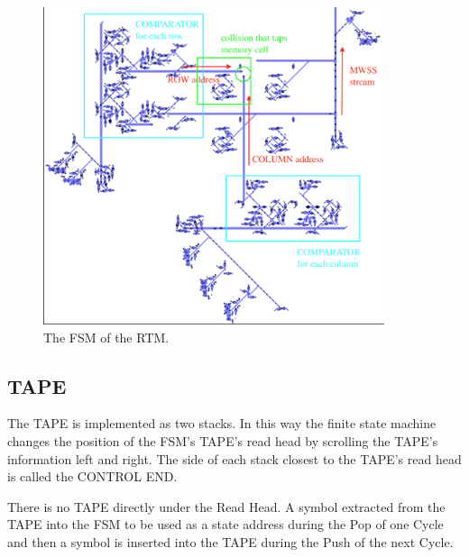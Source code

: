 \documentclass{article}
\begin{document}
\begin{figure}[h]
\centering
\includegraphics[width=10cm,keepaspectratio]{images/FSM.png}
\captionsetup{labelformat=empty} \caption{The FSM of the RTM.}
\end{figure}
\subsection{TAPE}


The TAPE is implemented as two stacks. In this way the finite state machine changes the position of the FSM's TAPE's read head by scrolling the TAPE's information left and right. The side of each stack closest to the TAPE's read head is called the CONTROL END.





There is no TAPE directly under the Read Head. A symbol extracted from the TAPE  into the FSM to be used as a state address during the Pop of one Cycle and then a symbol is inserted into the TAPE during the Push of the next Cycle.
\end{document}
